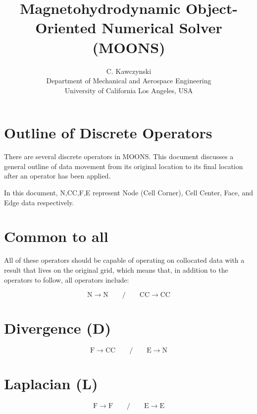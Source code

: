 \documentclass[11pt]{article}
\begin{document}
\doublespacing
\title{Magnetohydrodynamic Object-Oriented Numerical Solver (MOONS)}
\author{C. Kawczynski \\
Department of Mechanical and Aerospace Engineering \\
University of California Los Angeles, USA\\
}
\maketitle

\section{Outline of Discrete Operators}

There are several discrete operators in MOONS. This document discusses a general outline of data movement from its original location to its final location after an operator has been applied.

In this document, N,CC,F,E represent Node (Cell Corner), Cell Center, Face, and Edge data respectively.

\section{Common to all}

All of these operators should be capable of operating on collocated data with a result that lives on the original grid, which means that, in addition to the operators to follow, all operators include:

\begin{equation}
	\text{N} \rightarrow \text{N} 
	\qquad / \qquad 
	\text{CC} \rightarrow \text{CC}
\end{equation}


\section{Divergence (D)}

\begin{equation}
	\text{F} \rightarrow \text{CC}
	\qquad / \qquad 
	\text{E} \rightarrow \text{N}
\end{equation}

\section{Laplacian (L)}

\begin{equation}
	\text{F} \rightarrow \text{F}
	\qquad / \qquad 
	\text{E} \rightarrow \text{E}
\end{equation}
\end{document}
